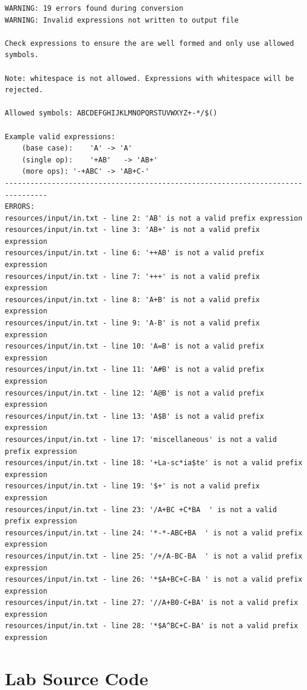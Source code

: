 \documentclass[10pt,letterpaper,final]{report}
\begin{document}
{\small
  \begin{center}
    \begin{verbatim}
WARNING: 19 errors found during conversion
WARNING: Invalid expressions not written to output file

Check expressions to ensure the are well formed and only use allowed symbols.

Note: whitespace is not allowed. Expressions with whitespace will be rejected.

Allowed symbols: ABCDEFGHIJKLMNOPQRSTUVWXYZ+-*/$()

Example valid expressions:
	(base case):	'A'	-> 'A'
	(single op):	'+AB'	-> 'AB+'
	(more ops):	'-+ABC'	-> 'AB+C-'
--------------------------------------------------------------------------------
ERRORS:
resources/input/in.txt - line 2: 'AB' is not a valid prefix expression
resources/input/in.txt - line 3: 'AB+' is not a valid prefix expression
resources/input/in.txt - line 6: '++AB' is not a valid prefix expression
resources/input/in.txt - line 7: '+++' is not a valid prefix expression
resources/input/in.txt - line 8: 'A+B' is not a valid prefix expression
resources/input/in.txt - line 9: 'A-B' is not a valid prefix expression
resources/input/in.txt - line 10: 'A=B' is not a valid prefix expression
resources/input/in.txt - line 11: 'A#B' is not a valid prefix expression
resources/input/in.txt - line 12: 'A@B' is not a valid prefix expression
resources/input/in.txt - line 13: 'A$B' is not a valid prefix expression
resources/input/in.txt - line 17: 'miscellaneous' is not a valid prefix expression
resources/input/in.txt - line 18: '+La-sc*ia$te' is not a valid prefix expression
resources/input/in.txt - line 19: '$+' is not a valid prefix expression
resources/input/in.txt - line 23: '/A+BC +C*BA  ' is not a valid prefix expression
resources/input/in.txt - line 24: '*-*-ABC+BA  ' is not a valid prefix expression
resources/input/in.txt - line 25: '/+/A-BC-BA  ' is not a valid prefix expression
resources/input/in.txt - line 26: '*$A+BC+C-BA ' is not a valid prefix expression
resources/input/in.txt - line 27: '//A+B0-C+BA' is not a valid prefix expression
resources/input/in.txt - line 28: '*$A^BC+C-BA' is not a valid prefix expression
\end{verbatim}
  \end{center}
}

\pagebreak

\section{Lab Source Code}
\end{document}
